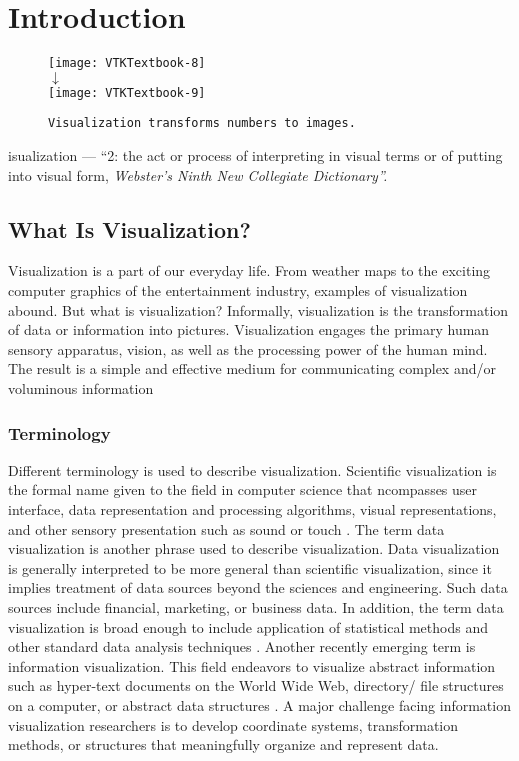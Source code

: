 \chapter{Introduction}
\label{chap:introduction}

\begin{figure}[ht]
	\hfill
	\begin{minipage}{0.5\textwidth}
		\centering
		\texttt{[image: VTKTextbook-8]}\\
		$\downarrow$\\
		\texttt{[image: VTKTextbook-9]}
		\caption*{\texttt{Visualization transforms numbers to images.}}
	\end{minipage}
\end{figure}


isualization — ``2: the act or process of interpreting in
visual terms or of putting into visual form, \emph{Webster’s Ninth New Collegiate Dictionary''.}

\section{What Is Visualization?}
Visualization is a part of our everyday life. From weather maps to the exciting computer graphics of the entertainment industry, examples of visualization abound.
But what is visualization? Informally, visualization is the transformation of data or information into pictures.
Visualization engages the primary human sensory apparatus, vision, as well as the processing power of the human mind.
The result is a simple and effective medium for communicating complex and/or voluminous information

\subsection{Terminology}
Different terminology is used to describe visualization. Scientific visualization is the formal name given to the field in computer science that  ncompasses user interface, data representation and processing algorithms, visual representations, and other sensory presentation such as sound or touch \cite{McCormick87}.
The term data visualization is another phrase used to describe visualization. Data visualization is generally interpreted to be more general than scientific visualization, since it implies treatment of data sources beyond the sciences and engineering. Such data sources include financial, marketing, or business data. In addition, the term data visualization is broad enough to include application of statistical methods and other standard data analysis techniques \cite{Rosenblum94}.
Another recently emerging term is information visualization. 
This field endeavors to visualize abstract information such as hyper-text documents on the World Wide Web, directory/ file structures on a computer, or abstract data structures \cite{InfoVis95}.
A major challenge facing information visualization researchers is to develop coordinate systems, transformation methods, or structures that meaningfully organize and represent data.

